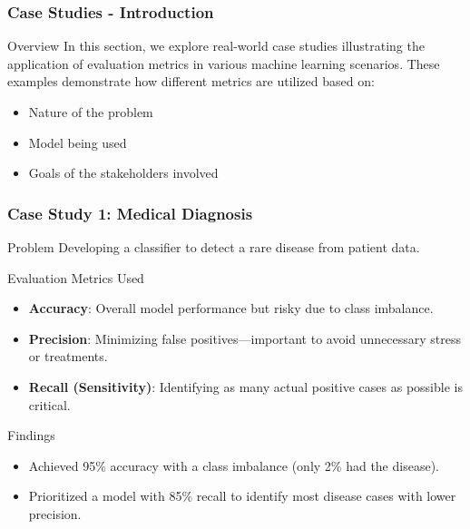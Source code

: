 \documentclass{beamer}
\begin{document}
\begin{frame}[fragile]
    \frametitle{Case Studies - Introduction}
    \begin{block}{Overview}
        In this section, we explore real-world case studies illustrating the application of evaluation metrics in various machine learning scenarios. 
        These examples demonstrate how different metrics are utilized based on:
    \end{block}
    \begin{itemize}
        \item Nature of the problem
        \item Model being used
        \item Goals of the stakeholders involved
    \end{itemize}
\end{frame}

\begin{frame}[fragile]
    \frametitle{Case Study 1: Medical Diagnosis}
    \begin{block}{Problem}
        Developing a classifier to detect a rare disease from patient data.
    \end{block}
    \begin{block}{Evaluation Metrics Used}
        \begin{itemize}
            \item \textbf{Accuracy}: Overall model performance but risky due to class imbalance.
            \item \textbf{Precision}: Minimizing false positives—important to avoid unnecessary stress or treatments.
            \item \textbf{Recall (Sensitivity)}: Identifying as many actual positive cases as possible is critical.
        \end{itemize}
    \end{block}
    \begin{block}{Findings}
        \begin{itemize}
            \item Achieved 95\% accuracy with a class imbalance (only 2\% had the disease).
            \item Prioritized a model with 85\% recall to identify most disease cases with lower precision.
        \end{itemize}
    \end{block}
\end{frame}
\end{document}
